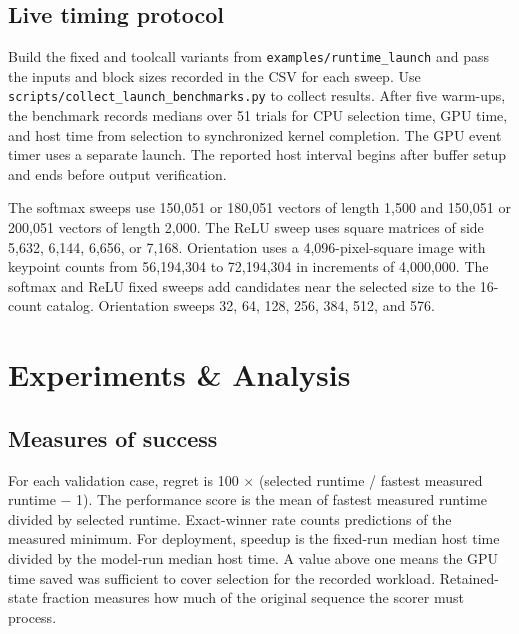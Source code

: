 \documentclass[11pt,letterpaper]{article}
\begin{document}
\subsection{Live timing protocol}

Build the fixed and toolcall variants from \texttt{examples/runtime\_launch} and pass the inputs and block
sizes recorded in the CSV for each sweep. Use \texttt{scripts/collect\_launch\_benchmarks.py} to collect
results. After five warm-ups, the benchmark records medians over 51 trials for CPU selection time, GPU time,
and host time from selection to synchronized kernel completion. The GPU event timer uses a separate launch.
The reported host interval begins after buffer setup and ends before output verification.


The softmax sweeps use 150,051 or 180,051 vectors of length 1,500 and 150,051 or 200,051 vectors of length
2,000. The ReLU sweep uses square matrices of side 5,632, 6,144, 6,656, or 7,168. Orientation uses a
4,096-pixel-square image with keypoint counts from 56,194,304 to 72,194,304 in increments of 4,000,000. The
softmax and ReLU fixed sweeps add candidates near the selected size to the 16-count catalog. Orientation
sweeps 32, 64, 128, 256, 384, 512, and 576.

\section{Experiments \& Analysis}

\subsection{Measures of success}

For each validation case, regret is 100 \ensuremath{\times} (selected runtime / fastest measured runtime
\ensuremath{-} 1). The performance score is the mean of fastest measured runtime divided by selected
runtime. Exact-winner rate counts predictions of the measured minimum. For deployment, speedup is the
fixed-run median host time divided by the model-run median host time. A value above one means the GPU time
saved was sufficient to cover selection for the recorded workload. Retained-state fraction measures how much
of the original sequence the scorer must process.
\end{document}
